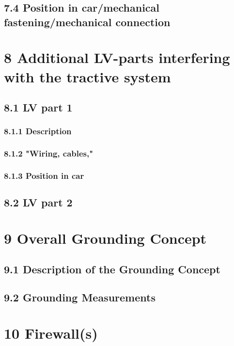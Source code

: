 \documentclass{article}
\begin{document}
\subsection*{7.4 Position in car/mechanical fastening/mechanical connection}

\section*{8 Additional LV-parts interfering with the tractive system}

\subsection*{8.1 LV part 1}

\subsubsection*{8.1.1 Description}

\subsubsection*{8.1.2 "Wiring, cables,"}

\subsubsection*{8.1.3 Position in car}

\subsection*{8.2 LV part 2}

\section*{9 Overall Grounding Concept}

\subsection*{9.1 Description of the Grounding Concept}

\subsection*{9.2 Grounding Measurements}

\section*{10 Firewall(s)}
\end{document}
